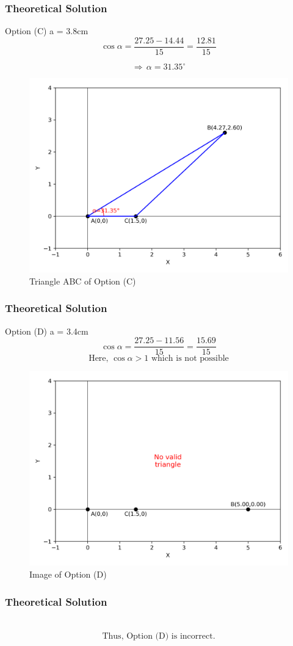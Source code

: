 \documentclass{beamer}
\begin{document}
\begin{frame}[fragile]
    \frametitle{Theoretical Solution}
    Option (C) a = 3.8cm
\begin{equation}
    \cos\alpha = \dfrac{27.25 - 14.44}{15} = \dfrac{12.81}{15}
\end{equation}

 \begin{equation}
\Rightarrow \, \alpha = 31.35^\circ     
 \end{equation}

\begin{figure}[htbp]
    \centering
    \includegraphics[width=0.6\columnwidth]{figs/fig3.png}
    \caption{Triangle ABC of Option (C)}
    \label{fig:placeholder}
\end{figure}
\end{frame}

\begin{frame}[fragile]
    \frametitle{Theoretical Solution}
    Option (D) a = 3.4cm
\begin{equation}
    \cos\alpha = \dfrac{27.25 - 11.56}{15} = \dfrac{15.69}{15}
\end{equation}
\begin{equation}
    \text{Here, } \cos\alpha > 1 \text{ which is not possible}
\end{equation}

\begin{figure}[htbp]
    \centering
    \includegraphics[width=0.6\columnwidth]{figs/fig4.png}
    \caption{Image of Option (D)}
    \label{fig:placeholder}
\end{figure}
\end{frame}

\begin{frame}[fragile]
    \frametitle{Theoretical Solution}\
    \begin{align*}
    \boxed{\text{Thus, Option (D) is incorrect.}}
\end{align*}
\end{frame}
\end{document}
